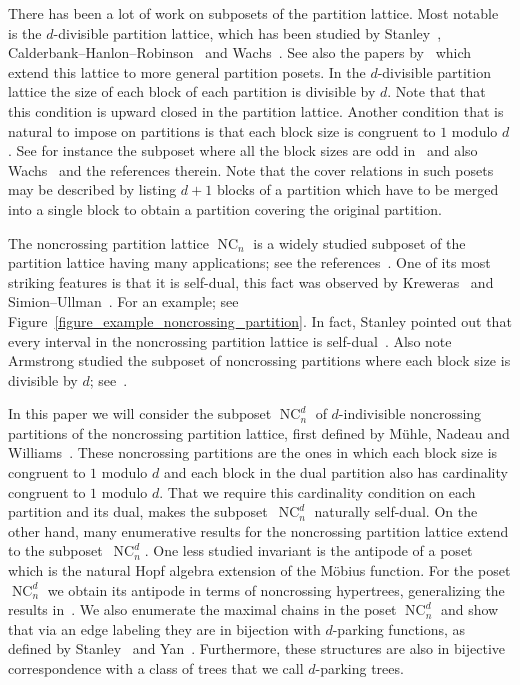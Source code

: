 \documentclass[11pt]{amsart}
\numberwithin{equation}{section}
\DeclareMathOperator{\NC}{NC}
\begin{document}
There has been a lot of work on subposets of the partition lattice.
Most notable is the $d$-divisible partition lattice, which has
been studied by
Stanley~\cite{Stanley_exponential_structures},
Calderbank--Hanlon--Robinson~\cite{Calderbank_Hanlon_Robinson}
and
Wachs~\cite{Wachs}.
See also the papers by~\cite{Ehrenborg_Hedmark,Ehrenborg_Jung}
which extend this lattice to more general partition posets.
In the $d$-divisible partition lattice the size of each block of each partition
is divisible by $d$. Note that that this condition is upward closed
in the partition lattice.
Another condition that is natural to impose on partitions is that
each block size is congruent to $1$ modulo $d$. See for instance
the subposet where all the block sizes are odd
in~\cite{Calderbank_Hanlon_Robinson} 
and also Wachs~\cite[Subsection~4.5.2]{Wachs_Poset_topology}
and the references therein.
Note that the cover relations in such posets may be described by listing 
$d+1$ blocks of a partition which have to be merged into a single block 
to obtain a partition covering the original partition.


The noncrossing partition lattice $\NC_{n}$ is a widely studied subposet of the partition lattice
having many applications;
see the references~\cite{Armstrong,Kreweras,Simion,Simion_Ullman,Speicher,Stanley}.
One of its most striking features is that it is self-dual,
this fact was observed by Kreweras~\cite{Kreweras}
and Simion--Ullman~\cite{Simion_Ullman}.
For an example; see Figure~\ref{figure_example_noncrossing_partition}.
In fact, Stanley pointed out that every interval 
in the noncrossing partition lattice
is self-dual~\cite{Stanley}.
Also note Armstrong studied the subposet of noncrossing partitions where each block
size is divisible by $d$; see~\cite{Armstrong}.

In this paper we will consider the subposet $\NC^{d}_{n}$ of
$d$-indivisible noncrossing partitions of the 
noncrossing partition lattice, first defined by M\"uhle, Nadeau and
Williams~\cite{Muhle_Nadeau_Williams}. These noncrossing partitions are
the ones in which each block size is congruent to $1$ modulo $d$
and each block in the dual partition also
has cardinality congruent to $1$ modulo $d$.
That we require this cardinality condition on each partition and
its dual, makes the subposet~$\NC^{d}_{n}$
naturally self-dual.
On the other hand, many enumerative results for the
noncrossing partition lattice extend to the subposet~$\NC^{d}_{n}$.
One less studied invariant is the antipode of a poset
which is the natural Hopf algebra extension of the M\"obius function.
For the poset $\NC^{d}_{n}$ we obtain its antipode
in terms of noncrossing hypertrees,
generalizing the results in~\cite{Ehrenborg_Happ}.
We also enumerate the maximal chains in the poset $\NC^{d}_{n}$
and show that via an edge labeling they are in
bijection with $d$-parking functions, as defined
by Stanley~\cite{Stanley_k-parking} and Yan~\cite{Yan}.
Furthermore, these structures are also in bijective
correspondence with a class of trees that we call $d$-parking trees.
\end{document}
